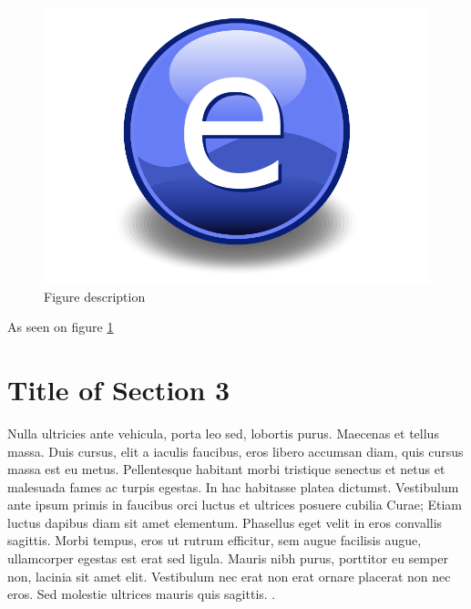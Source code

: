\vspace{0.4cm}
\begin{figure}[h]
  \centering
  \includegraphics[scale=0.3,angle=0]{Figures/Electron.pdf}
  \caption{Figure description}
  \label{electron}
\end{figure}


As seen on figure \ref{electron}


\section{Title of Section 3}
Nulla ultricies ante vehicula, porta leo sed, lobortis purus. Maecenas et tellus massa. Duis cursus, elit a iaculis faucibus, eros libero accumsan diam, quis cursus massa est eu metus. Pellentesque habitant morbi tristique senectus et netus et malesuada fames ac turpis egestas. In hac habitasse platea dictumst. Vestibulum ante ipsum primis in faucibus orci luctus et ultrices posuere cubilia Curae; Etiam luctus dapibus diam sit amet elementum. Phasellus eget velit in eros convallis sagittis. Morbi tempus, eros ut rutrum efficitur, sem augue facilisis augue, ullamcorper egestas est erat sed ligula. Mauris nibh purus, porttitor eu semper non, lacinia sit amet elit. Vestibulum nec erat non erat ornare placerat non nec eros. Sed molestie ultrices mauris quis sagittis.
\cite{Kogelnik, saleh2007fundamentals, Silfvast1996b, siegman1986lasers, amnon1989quantum}.
